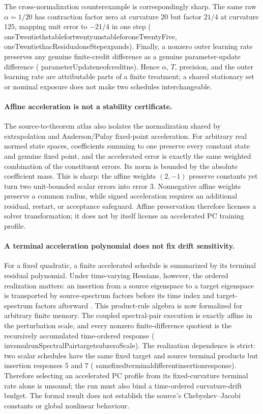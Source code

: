 \documentclass[11pt]{article}
\newcommand{\leanname}[1]{{\scriptsize\ttfamily
  \def\_{\textunderscore\allowbreak}#1}}
\begin{document}
The cross-normalization counterexample is correspondingly sharp. The same raw
$\alpha=1/20$ has contraction factor zero at curvature $20$ but factor $21/4$
at curvature $125$, mapping unit error to $-21/4$ in one step
(\leanname{oneTwentieth\_stable\_for\_twenty\_unstable\_for\_oneTwentyFive},
\leanname{oneTwentieth\_acResidual\_oneStep\_expands}). Finally, a nonzero outer
learning rate preserves any genuine finite-credit difference as a genuine
parameter-update difference
(\leanname{parameterUpdate\_ne\_of\_credit\_ne}). Hence $\alpha$, $T$, precision,
and the outer learning rate are attributable parts of a finite treatment; a shared
stationary set or nominal exposure does not make two schedules interchangeable.

\paragraph{Affine acceleration is not a stability certificate.}
The source-to-theorem atlas also isolates the normalization shared by extrapolation and
Anderson/Pulay fixed-point acceleration. For arbitrary real normed state spaces,
coefficients summing to one preserve every constant state and genuine fixed point, and
the accelerated error is exactly the same weighted combination of the constituent
errors. Its norm is bounded by the absolute coefficient mass. This is sharp: the affine
weights $(2,-1)$ preserve constants yet turn two unit-bounded scalar errors into error
$3$. Nonnegative affine weights preserve a common radius, while signed acceleration
requires an additional residual, restart, or acceptance safeguard. Affine preservation
therefore licenses a solver transformation; it does not by itself license an accelerated
PC training profile.

\paragraph{A terminal acceleration polynomial does not fix drift sensitivity.}
For a fixed quadratic, a finite accelerated schedule is summarized by its terminal
residual polynomial. Under time-varying Hessians, however, the ordered realization
matters: an insertion from a source eigenspace to a target eigenspace is transported by
source-spectrum factors before its time index and target-spectrum factors afterward
\cite{pasechnyuk2026}. This product-rule algebra is now formalized for arbitrary finite
memory. The coupled spectral-pair execution is exactly affine in the perturbation scale,
and every nonzero finite-difference quotient is the recursively accumulated
time-ordered response
(\leanname{inv\_smul\_runSpectralPair\_target\_sub\_zeroScale}).
The realization dependence is strict: two scalar schedules have the same fixed target
and source terminal products but insertion responses $5$ and $7$
(\leanname{same\_fixed\_terminal\_different\_insertion\_response}).
Therefore selecting an accelerated PC profile from its fixed-curvature terminal rate
alone is unsound; the run must also bind a time-ordered curvature-drift budget. The
formal result does not establish the source's Chebyshev--Jacobi constants or global
nonlinear behaviour.
\end{document}
